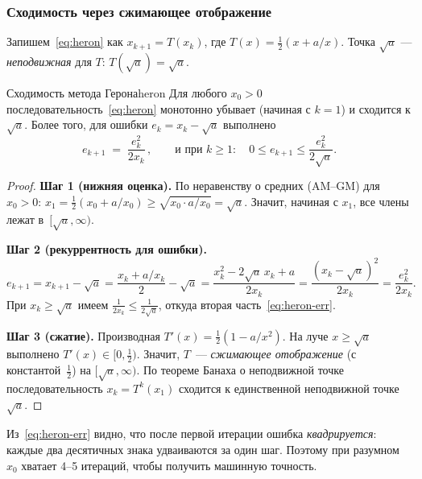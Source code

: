 \subsubsection*{Сходимость через сжимающее отображение}

Запишем~\eqref{eq:heron} как $x_{k+1}=T(x_k)$, где
$T(x)=\tfrac12(x+a/x)$. Точка $\sqrt{a}$ — \emph{неподвижная} для $T$:
$T(\sqrt{a})=\sqrt{a}$.

\begin{theorem}{Сходимость метода Герона}{heron}
Для любого $x_0>0$ последовательность~\eqref{eq:heron} монотонно
убывает (начиная с $k=1$) и сходится к $\sqrt{a}$. Более того, для
ошибки $e_k=x_k-\sqrt{a}$ выполнено
\begin{equation}\label{eq:heron-err}
e_{k+1}\;=\;\dfrac{e_k^2}{2x_k}\,, \qquad
\text{и при }k\geq 1\colon\quad
0\le e_{k+1}\le \dfrac{e_k^{2}}{2\sqrt{a}}.
\end{equation}
\end{theorem}

\begin{proof}
\textbf{Шаг 1 (нижняя оценка).} По неравенству о средних
(AM--GM) для $x_0>0$:
$x_1=\tfrac12(x_0+a/x_0)\geq \sqrt{x_0\cdot a/x_0}=\sqrt{a}$.
Значит, начиная с $x_1$, все члены лежат в~$[\sqrt{a},\infty)$.

\textbf{Шаг 2 (рекуррентность для ошибки).}
\[
e_{k+1}=x_{k+1}-\sqrt{a}=\dfrac{x_k+a/x_k}{2}-\sqrt{a}
=\dfrac{x_k^{2}-2\sqrt{a}\,x_k+a}{2x_k}=\dfrac{(x_k-\sqrt{a})^2}{2x_k}=\dfrac{e_k^{2}}{2x_k}.
\]
При $x_k\geq\sqrt{a}$ имеем $\tfrac{1}{2x_k}\leq\tfrac{1}{2\sqrt{a}}$,
откуда вторая часть~\eqref{eq:heron-err}.

\textbf{Шаг 3 (сжатие).} Производная $T'(x)=\tfrac12(1-a/x^{2})$.
На луче $x\geq\sqrt{a}$ выполнено $T'(x)\in[0,\tfrac12)$. Значит,
$T$~— \emph{сжимающее отображение} (с константой~$\tfrac12$) на
$[\sqrt{a},\infty)$. По теореме Банаха о неподвижной точке
последовательность $x_k=T^{k}(x_1)$ сходится к единственной
неподвижной точке~$\sqrt{a}$.
\end{proof}

Из~\eqref{eq:heron-err} видно, что после первой итерации ошибка
\emph{квадрируется}: каждые два десятичных знака удваиваются за
один шаг. Поэтому при разумном $x_0$ хватает 4--5 итераций, чтобы
получить машинную точность.

